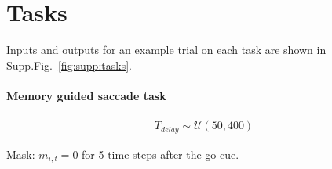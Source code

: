\documentclass{article} %
\newcounter{ct}
\theoremstyle{definition}
\theoremstyle{remark}
\begin{document}
%
%
%
%



\newpage
\newpage
\section{Tasks}\label{sec:supp:tasks}
Inputs and outputs for an example trial on each task are shown in Supp.Fig.~\ref{fig:supp:tasks}.


\paragraph{Memory guided saccade task}


\begin{align}
T_{delay} \sim \mathcal{U}(50, 400) 
\end{align}

Mask:
$m_{i,t}=0$ for 5 time steps after the go cue.
\end{document}
